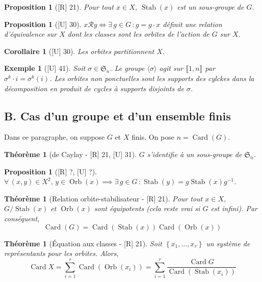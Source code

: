 \documentclass[10pt, a4paper, parskip=full, twoside, twocolumn]{report}
\newtheorem{theorem}[definition]{Théorème}
\newtheorem{proposition}[definition]{Proposition}
\newtheorem{corollary}[definition]{Corollaire}
\newtheorem{example}[definition]{Exemple}
\DeclareMathOperator{\card}{Card}
\DeclareMathOperator{\Orb}{Orb}
\DeclareMathOperator{\Stab}{Stab}
\begin{document}
\begin{proposition}[\textnormal{[R] 21}]
	Pour tout $x\in X$, $\Stab(x)$ est un sous-groupe de $G$.
\end{proposition}

\begin{proposition}[\textnormal{[U] 30}]
	$x\mathcal{R}y \iff \exists\, g\in G\,\colon g=g\cdot x$ définit 
	une relation d'équivalence sur $X$ dont les classes sont les orbites de l'action de $G$ sur $X$.
\end{proposition}

\begin{corollary}[\textnormal{[U] 30}]
	Les orbites partitionnent $X$.
\end{corollary}

\begin{example}[\textnormal{[U] 41}]
	Soit $\sigma\in\mathfrak{S}_n$. Le groupe $\langle\sigma\rangle$ agit sur $\llbracket 1,n\rrbracket$ par $\sigma^k\cdot i = \sigma^k(i)$.
	Les orbites non ponctuelles sont les supports des cylckes dans la décomposition en produit de cycles à supports disjoints de $\sigma$.
\end{example}

\subsection*{B. Cas d'un groupe et d'un ensemble finis}
Dans ce paragraphe, on suppose $G$ et $X$ finis. On pose $n = \card(G)$.
\begin{theorem}[de Caylay - \textnormal{[R] 21, [U] 31}]
	$G$ s'identifie à un sous-groupe de $\mathfrak{S}_n$.
\end{theorem}
\begin{proposition}[\textnormal{[R] ?, [U] ?}]
	$\forall\, (x,y)\in X^2,\, y\in \Orb(x)\implies \exists\, g\in G\,\colon \Stab(y) = g\Stab(x)g^{-1}$.
\end{proposition}

\begin{theorem}[Relation orbite-stabilisateur - \textnormal{[R] 21}]
	Pour tout $x\in X$, $G/\Stab(x)$ et $\Orb(x)$ sont équipotents (cela reste vrai si $G$ est infini).
	Par conséquent,
	$$\card(G) = \card(\Stab(x))\card(\Orb(x))$$
\end{theorem}

\begin{theorem}[Équation aux classes - \textnormal{[R] 21}]Soit $\left\{x_1,\dots,x_r\right\}$ un système de représentants pour les orbites. Alors,
	$$\card X = \sum_{i=1}^{r} \card(\Orb(x_i)) = \sum_{i=1}^{r} \frac{\card G}{\card(\Stab(x_i))}$$
\end{theorem}
\end{document}
